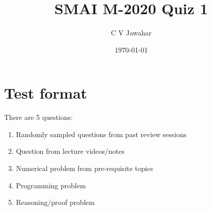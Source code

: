 \documentclass{article}
\title{SMAI M-2020 Quiz 1}
\author{C V Jawahar}
\date{\today}
\begin{document}
\maketitle
\tableofcontents

\section{Test format}
There are 5 questions:
\begin{enumerate}
    \item Randomly sampled questions from past review sessions
    \item Question from lecture videos/notes
    \item Numerical problem from pre-requisite topics
    \item Programming problem
    \item Reasoning/proof problem
\end{enumerate}
\end{document}
